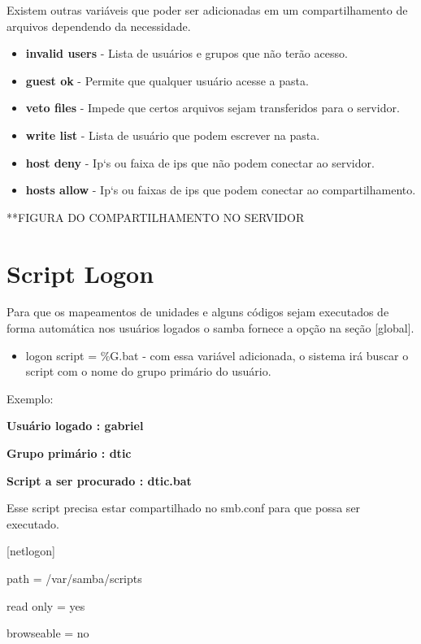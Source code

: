 Existem outras variáveis que poder ser adicionadas em um compartilhamento de arquivos dependendo da necessidade.

\begin{itemize}
	\item \textbf{invalid users} - Lista de usuários e grupos que não terão acesso.
	\item \textbf{guest ok} - Permite que qualquer usuário acesse a pasta.
	\item \textbf{veto files} - Impede que certos arquivos sejam transferidos para o servidor.
	\item \textbf{write list} - Lista de usuário que podem escrever na pasta.
	\item \textbf{host deny} - Ip`s ou faixa de ips que não podem conectar ao servidor.
	\item \textbf{hosts allow} - Ip`s ou faixas de ips que podem conectar ao compartilhamento.
\end{itemize}

**FIGURA DO COMPARTILHAMENTO NO SERVIDOR

\section{Script Logon}

Para que os mapeamentos de unidades e alguns códigos sejam executados de forma automática nos usuários logados o samba fornece a opção na seção [global]. 

\begin{itemize}
	\item {logon script = \%G.bat } - com essa variável adicionada, o sistema irá buscar o script com o nome do grupo primário do usuário. 
\end{itemize}

Exemplo: 

\textbf{Usuário logado : gabriel}

\textbf{Grupo primário : dtic}

\textbf{Script a ser procurado : dtic.bat}

Esse script precisa estar compartilhado no smb.conf para que possa ser executado. 

	[netlogon] 

		path = /var/samba/scripts 

		read only = yes 

		browseable = no 
		

